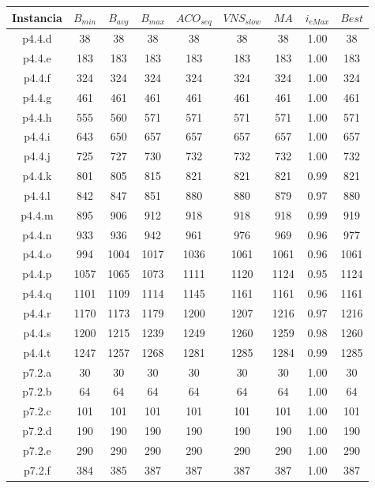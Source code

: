 \begin{table}
\begin{center}
\begin{tabular}{ |c|c|c|c|c|c|c|c|c| } 
\hline
Instancia & $B_{min}$ & $B_{avg}$ & $B_{max}$ & $ACO_{seq}$ & $VNS_{slow}$ & $MA$ & $i_{eMax}$ & $Best$ \\
\hline
p4.4.d & 38 & 38 & 38 & 38 & 38 & 38 & 1.00 & 38 \\
p4.4.e & 183 & 183 & 183 & 183 & 183 & 183 & 1.00 & 183 \\
p4.4.f & 324 & 324 & 324 & 324 & 324 & 324 & 1.00 & 324 \\
p4.4.g & 461 & 461 & 461 & 461 & 461 & 461 & 1.00 & 461 \\
p4.4.h & 555 & 560 & 571 & 571 & 571 & 571 & 1.00 & 571 \\
p4.4.i & 643 & 650 & 657 & 657 & 657 & 657 & 1.00 & 657 \\
p4.4.j & 725 & 727 & 730 & 732 & 732 & 732 & 1.00 & 732 \\
p4.4.k & 801 & 805 & 815 & 821 & 821 & 821 & 0.99 & 821 \\
p4.4.l & 842 & 847 & 851 & 880 & 880 & 879 & 0.97 & 880 \\
p4.4.m & 895 & 906 & 912 & 918 & 918 & 918 & 0.99 & 919 \\
p4.4.n & 933 & 936 & 942 & 961 & 976 & 969 & 0.96 & 977 \\
p4.4.o & 994 & 1004 & 1017 & 1036 & 1061 & 1061 & 0.96 & 1061 \\
p4.4.p & 1057 & 1065 & 1073 & 1111 & 1120 & 1124 & 0.95 & 1124 \\
p4.4.q & 1101 & 1109 & 1114 & 1145 & 1161 & 1161 & 0.96 & 1161 \\
p4.4.r & 1170 & 1173 & 1179 & 1200 & 1207 & 1216 & 0.97 & 1216 \\
p4.4.s & 1200 & 1215 & 1239 & 1249 & 1260 & 1259 & 0.98 & 1260 \\
p4.4.t & 1247 & 1257 & 1268 & 1281 & 1285 & 1284 & 0.99 & 1285 \\
p7.2.a & 30 & 30 & 30 & 30 & 30 & 30 & 1.00 & 30 \\
p7.2.b & 64 & 64 & 64 & 64 & 64 & 64 & 1.00 & 64 \\
p7.2.c & 101 & 101 & 101 & 101 & 101 & 101 & 1.00 & 101 \\
p7.2.d & 190 & 190 & 190 & 190 & 190 & 190 & 1.00 & 190 \\
p7.2.e & 290 & 290 & 290 & 290 & 290 & 290 & 1.00 & 290 \\
p7.2.f & 384 & 385 & 387 & 387 & 387 & 387 & 1.00 & 387 \\

\end{tabular}
\end{center}
\end{table}
